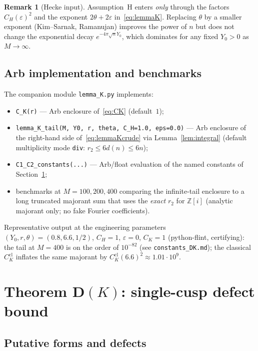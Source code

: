 \documentclass[11pt]{amsart}
\theoremstyle{definition}
\newtheorem{remark}[theorem]{Remark}
\newcommand{\ZZ}{\mathbb{Z}}
\newcommand{\eps}{\varepsilon}
\newcommand{\tht}{\theta}
\begin{document}
\begin{remark}[Hecke input]
\label{rem:hecke-entry-K}
Assumption~H enters \emph{only} through the factors $C_H(\eps)^2$ and the
exponent $2\tht+2\eps$ in~\eqref{eq:lemmaK}.  Replacing $\tht$ by a smaller
exponent (Kim--Sarnak, Ramanujan) improves the power of $n$ but does not
change the exponential decay $e^{-4\pi\sqrt{n}Y_0}$, which dominates for
any fixed $Y_0>0$ as $M\to\infty$.
\end{remark}

\subsection{Arb implementation and benchmarks}

The companion module \texttt{lemma\_K.py} implements:
\begin{itemize}[leftmargin=*]
\item \texttt{C\_K(r)} --- Arb enclosure of~\eqref{eq:CK} (default~$1$);
\item \texttt{lemma\_K\_tail(M, Y0, r, theta, C\_H=1.0, eps=0.0)} --- Arb
enclosure of the right-hand side of~\eqref{eq:lemmaKcrude} via
Lemma~\ref{lem:integral} (default multiplicity mode \texttt{div}:
$r_2\le 6d(n)\le 6n$);
\item \texttt{C1\_C2\_constants(...)} --- Arb/float evaluation of the
named constants of Section~\ref{sec:DK};
\item benchmarks at $M=100,200,400$ comparing the infinite-tail enclosure
to a long truncated majorant sum that uses the \emph{exact} $r_2$ for
$\ZZ[i]$ (analytic majorant only; no fake Fourier coefficients).
\end{itemize}

Representative output at the engineering parameters
$(Y_0,r,\tht)=(0.8,6.6,1/2)$, $C_H=1$, $\eps=0$, $C_K=1$ (python-flint,
certifying): the tail at $M=400$ is on the order of $10^{-82}$ (see
\texttt{constants\_DK.md}); the classical $C_K^{\mathrm{cl}}$ inflates
the same majorant by $C_K^{\mathrm{cl}}(6.6)^2\approx 1.01\cdot 10^{9}$.

\section{Theorem D$(K)$: single-cusp defect bound}
\label{sec:DK}

\subsection{Putative forms and defects}
\end{document}
